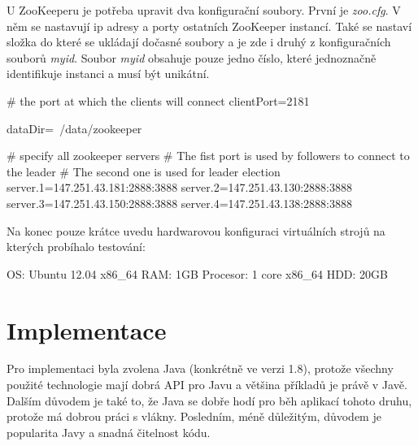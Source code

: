 \documentclass[
  digital, %
  table,   %
  nolof,     %
  nolot,     %
  oneside, %
  nocover,
  monochrome,
  12pt
]{fithesis3}
\begin{document}
U ZooKeeperu je potřeba upravit dva konfigurační soubory. První je \textit{zoo.cfg}. V něm se nastavují ip adresy a porty ostatních ZooKeeper instancí. Také se nastaví složka do které se ukládají dočasné soubory a je zde i druhý z konfiguračních souborů \textit{myid}. Soubor \textit{myid} obsahuje pouze jedno číslo, které jednoznačně identifikuje instanci a musí být unikátní.

\begin{center}
\begin{minipage}[H]{\linewidth}
	\begin{mylisting}
# the port at which the clients will connect
clientPort=2181

dataDir=~/data/zookeeper

# specify all zookeeper servers
# The fist port is used by followers to connect to the leader
# The second one is used for leader election
server.1=147.251.43.181:2888:3888
server.2=147.251.43.130:2888:3888
server.3=147.251.43.150:2888:3888
server.4=147.251.43.138:2888:3888
	\end{mylisting}
	\label{fig:zk-conf} 
\end{minipage}
\end{center}

Na konec pouze krátce uvedu hardwarovou konfiguraci virtuálních strojů na kterých probíhalo testování:

\begin{center}
\begin{minipage}[H]{.5\linewidth}
	\begin{mylisting}
OS: Ubuntu 12.04 x86_64
RAM: 1GB
Procesor: 1 core x86_64
HDD: 20GB
	\end{mylisting}
	\label{fig:virt-hw-conf} 
\end{minipage}
\end{center}

\section{Implementace}
\label{sec:implementation}
Pro implementaci byla zvolena Java (konkrétně ve verzi 1.8), protože všechny použité technologie mají dobrá API pro Javu a většina příkladů je právě v Javě. Dalším důvodem je také to, že Java se dobře hodí pro běh aplikací tohoto druhu, protože má dobrou práci s vlákny. Posledním, méně důležitým, důvodem je popularita Javy a snadná čitelnost kódu.
\end{document}
